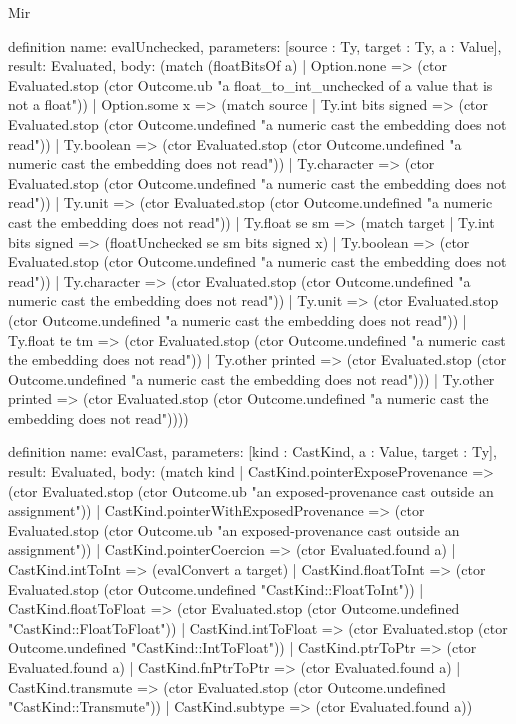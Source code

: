 \begin{lexlean}{Mir}
\begin{semanticmodule}
definition{
  name: evalUnchecked,
  parameters: [source : Ty, target : Ty, a : Value],
  result: Evaluated,
  body: (match (floatBitsOf a)
    | Option.none => (ctor Evaluated.stop (ctor Outcome.ub "a float_to_int_unchecked of a value that is not a float"))
    | Option.some x => (match source
      | Ty.int bits signed => (ctor Evaluated.stop (ctor Outcome.undefined "a numeric cast the embedding does not read"))
      | Ty.boolean => (ctor Evaluated.stop (ctor Outcome.undefined "a numeric cast the embedding does not read"))
      | Ty.character => (ctor Evaluated.stop (ctor Outcome.undefined "a numeric cast the embedding does not read"))
      | Ty.unit => (ctor Evaluated.stop (ctor Outcome.undefined "a numeric cast the embedding does not read"))
      | Ty.float se sm => (match target
        | Ty.int bits signed => (floatUnchecked se sm bits signed x)
        | Ty.boolean => (ctor Evaluated.stop (ctor Outcome.undefined "a numeric cast the embedding does not read"))
        | Ty.character => (ctor Evaluated.stop (ctor Outcome.undefined "a numeric cast the embedding does not read"))
        | Ty.unit => (ctor Evaluated.stop (ctor Outcome.undefined "a numeric cast the embedding does not read"))
        | Ty.float te tm => (ctor Evaluated.stop (ctor Outcome.undefined "a numeric cast the embedding does not read"))
        | Ty.other printed => (ctor Evaluated.stop (ctor Outcome.undefined "a numeric cast the embedding does not read")))
      | Ty.other printed => (ctor Evaluated.stop (ctor Outcome.undefined "a numeric cast the embedding does not read"))))
}

definition{
  name: evalCast,
  parameters: [kind : CastKind, a : Value, target : Ty],
  result: Evaluated,
  body: (match kind
    | CastKind.pointerExposeProvenance => (ctor Evaluated.stop (ctor Outcome.ub "an exposed-provenance cast outside an assignment"))
    | CastKind.pointerWithExposedProvenance => (ctor Evaluated.stop (ctor Outcome.ub "an exposed-provenance cast outside an assignment"))
    | CastKind.pointerCoercion => (ctor Evaluated.found a)
    | CastKind.intToInt => (evalConvert a target)
    | CastKind.floatToInt => (ctor Evaluated.stop (ctor Outcome.undefined "CastKind::FloatToInt"))
    | CastKind.floatToFloat => (ctor Evaluated.stop (ctor Outcome.undefined "CastKind::FloatToFloat"))
    | CastKind.intToFloat => (ctor Evaluated.stop (ctor Outcome.undefined "CastKind::IntToFloat"))
    | CastKind.ptrToPtr => (ctor Evaluated.found a)
    | CastKind.fnPtrToPtr => (ctor Evaluated.found a)
    | CastKind.transmute => (ctor Evaluated.stop (ctor Outcome.undefined "CastKind::Transmute"))
    | CastKind.subtype => (ctor Evaluated.found a))
}


\end{semanticmodule}
\end{lexlean}
